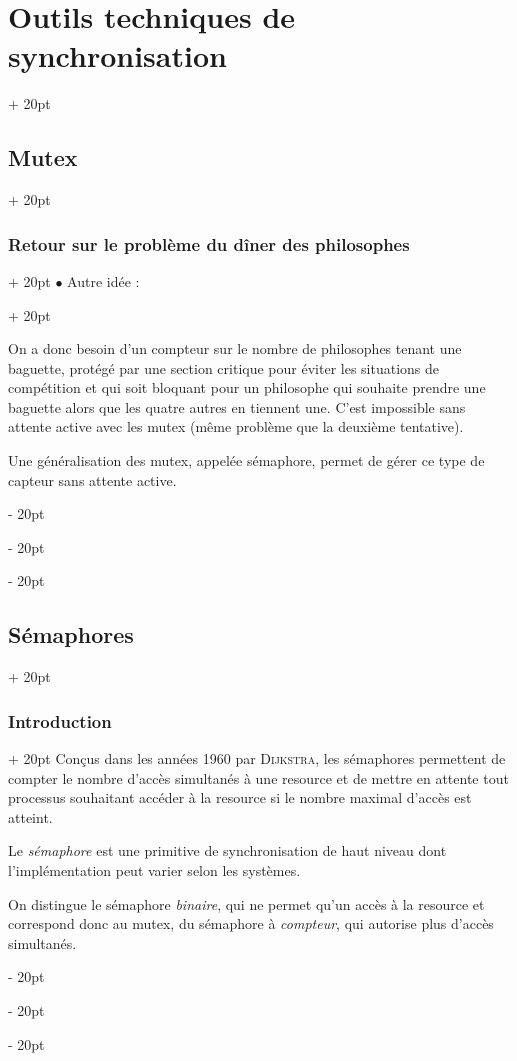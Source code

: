 \documentclass[a4paper, 12pt, twoside]{article}
\newcommand{\ind}[1][20pt]{\advance\leftskip + #1}
\newcommand{\deind}[1][20pt]{\advance\leftskip - #1}
\newenvironment{indt}[2][20pt]{#2 \par \ind[#1]}{\par \deind} %
\begin{document}
\begin{indt}{\section{Outils techniques de synchronisation}}
\begin{indt}{\subsection{Mutex}}
\begin{indt}{\subsubsection{Retour sur le problème du dîner des philosophes}}
\begin{indt}{$\bullet$ Autre idée :}
\begin{center}
                    \end{center}

                    On a donc besoin d'un compteur sur le nombre de philosophes tenant une baguette, protégé par une section critique pour éviter les situations de compétition et qui soit bloquant pour un philosophe qui souhaite prendre une baguette alors que les quatre autres en tiennent une.
                    C'est impossible sans attente active avec les mutex (même problème que la deuxième tentative).

                    Une généralisation des mutex, appelée sémaphore, permet de gérer ce type de capteur sans attente active.
                \end{indt}
            \end{indt}
        \end{indt}

        \vspace{12pt}
        
        \begin{indt}{\subsection{Sémaphores}}
            \begin{indt}{\subsubsection{Introduction}}
                Conçus dans les années 1960 par \textsc{Dijkstra}, les sémaphores permettent de compter le nombre d'accès simultanés à une resource et de mettre en attente tout processus souhaitant accéder à la resource si le nombre maximal d'accès est atteint.

                Le \emph{sémaphore} est une primitive de synchronisation de haut niveau dont l'implémentation peut varier selon les systèmes.

                On distingue le sémaphore \emph{binaire}, qui ne permet qu'un accès à la resource et correspond donc au mutex, du sémaphore à \emph{compteur}, qui autorise plus d'accès simultanés.
            \end{indt}


\end{indt}
\end{indt}
\end{document}
